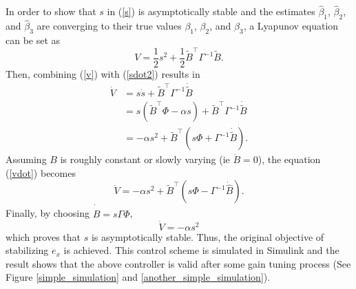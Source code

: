 In order to show that $s$ in (\ref{s}) is asymptotically stable and the estimates $\hat{\beta}_1$, $\hat{\beta}_2$, and $\hat{\beta}_3$ are converging to their true values $\beta_1$, $\beta_2$, and $\beta_3$, a Lyapunov equation can be set as
\begin{equation}
V=\frac{1}{2}s^2+\frac{1}{2}\tilde{B}^\top \Gamma^{-1}\tilde{B}.
\label{v}
\end{equation}
Then, combining (\ref{v}) with (\ref{sdot2}) results in
\begin{align}
\dot{V}&=s\dot{s}+\tilde{B}^\top \Gamma^{-1}\dot{\tilde{B}}
\\&=s(\tilde{B}^\top\Phi-\alpha s)+\tilde{B}^\top \Gamma^{-1}\dot{\tilde{B}}
\\&=-\alpha s^2+\tilde{B}^\top(s\Phi+\Gamma^{-1}\dot{\tilde{B}}).
\label{vdot}
\end{align}
Assuming $B$ is roughly constant or slowly varying (ie $\dot{B}=0$), the equation (\ref{vdot}) becomes 
\begin{equation}
\dot{V}=-\alpha s^2+\tilde{B}^\top(s\Phi-\Gamma^{-1}\dot{\hat{B}}).
\end{equation}
Finally, by choosing $\dot{\hat{B}}=s\Gamma\Phi$, 
\begin{equation}
\dot{V}=-\alpha s^2
\end{equation}
which proves that $s$ is asymptotically stable. Thus, the original objective of stabilizing $e_x$ is achieved. This control scheme is simulated in Simulink and the result shows that the above controller is valid after some gain tuning process (See Figure \ref{simple_simulation} and \ref{another_simple_simulation}). 
